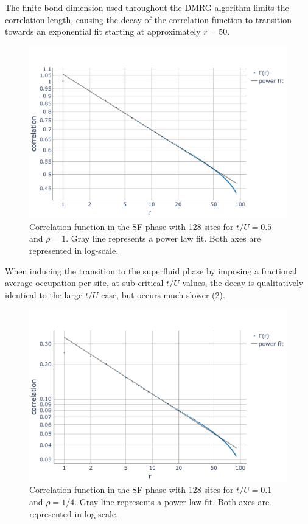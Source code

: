 \documentclass[twoside,twocolumn,9pt]{article}
\begin{document}
The finite bond dimension used throughout the DMRG algorithm limits the correlation length, causing the decay of the correlation function to transition towards an exponential fit starting at approximately $r=50$.
\begin{center}
  \begin{figure}
      \includegraphics[width=\linewidth]{../code/figures/Correlations-SF1.pdf}
      \caption{Correlation function in the SF phase with 128 sites for $t/U=0.5$ and $\rho=1$. Gray line represents a power law fit. Both axes are represented in log-scale.}
      \label{fig:corSF1}
  \end{figure}
\end{center}
When inducing the transition to the superfluid phase by imposing a fractional average occupation per site, at sub-critical $t/U$ values, the decay is qualitatively identical to the large $t/U$ case, but occurs much slower (\cref{fig:corSF2}).
\begin{center}
  \begin{figure}
      \includegraphics[width=\linewidth]{../code/figures/Correlations-SF2.pdf}
      \caption{Correlation function in the SF phase with 128 sites for $t/U=0.1$ and $\rho=1/4$. Gray line represents a power law fit. Both axes are represented in log-scale.}
      \label{fig:corSF2}
  \end{figure}
\end{center}
 
\end{document}
